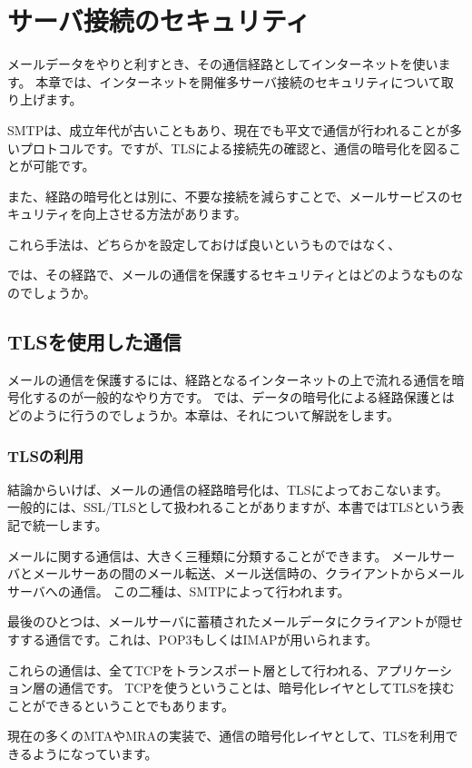 \chapter{サーバ接続のセキュリティ}

メールデータをやりと利すとき、その通信経路としてインターネットを使います。
本章では、インターネットを開催多サーバ接続のセキュリティについて取り上げます。

SMTPは、成立年代が古いこともあり、現在でも平文で通信が行われることが多いプロトコルです。ですが、TLSによる接続先の確認と、通信の暗号化を図ることが可能です。

また、経路の暗号化とは別に、不要な接続を減らすことで、メールサービスのセキュリティを向上させる方法があります。

これら手法は、どちらかを設定しておけば良いというものではなく、

では、その経路で、メールの通信を保護するセキュリティとはどのようなものなのでしょうか。


\section{TLSを使用した通信}

メールの通信を保護するには、経路となるインターネットの上で流れる通信を暗号化するのが一般的なやり方です。
では、データの暗号化による経路保護とはどのように行うのでしょうか。本章は、それについて解説をします。

\subsection{TLSの利用}

結論からいけば、メールの通信の経路暗号化は、TLSによっておこないます。
一般的には、SSL/TLSとして扱われることがありますが、本書ではTLSという表記で統一します。

メールに関する通信は、大きく三種類に分類することができます。
メールサーバとメールサーあの間のメール転送、メール送信時の、クライアントからメールサーバへの通信。
この二種は、SMTPによって行われます。

最後のひとつは、メールサーバに蓄積されたメールデータにクライアントが隠せすする通信です。これは、POP3もしくはIMAPが用いられます。

これらの通信は、全てTCPをトランスポート層として行われる、アプリケーション層の通信です。
TCPを使うということは、暗号化レイヤとしてTLSを挟むことができるということでもあります。

現在の多くのMTAやMRAの実装で、通信の暗号化レイヤとして、TLSを利用できるようになっています。

